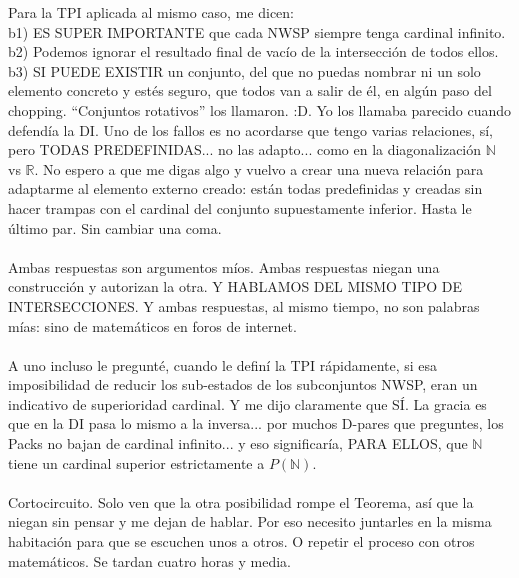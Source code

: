 	\noindent
	Para la TPI aplicada al mismo caso, me dicen:\\
	b1) ES SUPER IMPORTANTE que cada NWSP siempre tenga cardinal infinito.\\
	b2) Podemos ignorar el resultado final de vacío de la intersección de todos ellos.\\
	b3) SI PUEDE EXISTIR un conjunto, del que no puedas nombrar ni un solo elemento concreto y estés seguro, que todos van a salir de él, en algún paso del chopping. ``Conjuntos rotativos'' los llamaron. :D. Yo los llamaba parecido cuando defendía la DI. Uno de los fallos es no acordarse que tengo varias relaciones, sí, pero TODAS PREDEFINIDAS... no las adapto... como en la diagonalización $\mathbb{N}$ vs $\mathbb{R}$. No espero a que me digas algo y vuelvo a crear una nueva relación para adaptarme al elemento externo creado: están todas predefinidas y creadas sin hacer trampas con el cardinal del conjunto supuestamente inferior. Hasta le último par. Sin cambiar una coma.
	\\\\
	
	\noindent
	Ambas respuestas son argumentos míos. Ambas respuestas niegan una construcción y autorizan la otra. Y HABLAMOS DEL MISMO TIPO DE INTERSECCIONES. Y ambas respuestas, al mismo tiempo, no son palabras mías: sino de matemáticos en foros de internet.
	\\\\
	
	\noindent
	A uno incluso le pregunté, cuando le definí la TPI rápidamente, si esa imposibilidad de reducir los sub-estados de los subconjuntos NWSP, eran un indicativo de superioridad cardinal. Y me dijo claramente que SÍ. La gracia es que en la DI pasa lo mismo a la inversa... por muchos D-pares que preguntes, los Packs no bajan de cardinal infinito... y eso significaría, PARA ELLOS, que $\mathbb{N}$ tiene un cardinal superior estrictamente a $P(\mathbb{N})$.
	\\\\
	
	\noindent
	Cortocircuito. Solo ven que la otra posibilidad rompe el Teorema, así que la niegan sin pensar y me dejan de hablar. Por eso necesito juntarles en la misma habitación para que se escuchen unos a otros. O repetir el proceso con otros matemáticos. Se tardan cuatro horas y media.
	\\\\
	
